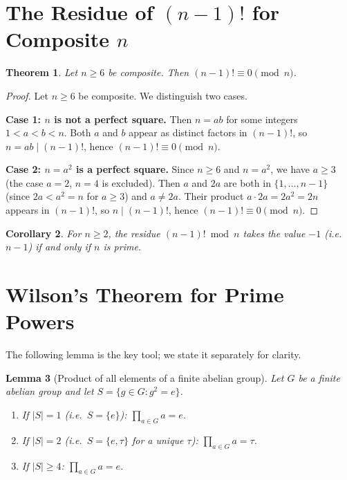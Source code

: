 \documentclass[12pt,a4paper]{amsart}
\newtheorem{theorem}{Theorem}[section]
\newtheorem{lemma}[theorem]{Lemma}
\newtheorem{corollary}[theorem]{Corollary}
\theoremstyle{definition}
\begin{document}
\section{The Residue of $(n-1)!$ for Composite $n$}

\begin{theorem}\label{thm:composite_factorial}
  Let $n \geq 6$ be composite.  Then $(n-1)! \equiv 0 \pmod n$.
\end{theorem}

\begin{proof}
  Let $n \geq 6$ be composite.  We distinguish two cases.

  \textbf{Case 1: $n$ is not a perfect square.}
  Then $n = ab$ for some integers $1 < a < b < n$.
  Both $a$ and $b$ appear as distinct factors in $(n-1)!$,
  so $n = ab \mid (n-1)!$, hence $(n-1)! \equiv 0 \pmod n$.

  \textbf{Case 2: $n = a^2$ is a perfect square.}
  Since $n \geq 6$ and $n = a^2$, we have $a \geq 3$
  (the case $a=2$, $n=4$ is excluded).
  Then $a$ and $2a$ are both in $\{1,\ldots,n-1\}$
  (since $2a < a^2 = n$ for $a \geq 3$) and $a \ne 2a$.
  Their product $a \cdot 2a = 2a^2 = 2n$ appears in $(n-1)!$,
  so $n \mid (n-1)!$, hence $(n-1)! \equiv 0 \pmod n$.
\end{proof}

\begin{corollary}
  For $n \geq 2$, the residue $(n-1)! \bmod n$ takes the value $-1$ (i.e.\ $n-1$)
  if and only if $n$ is prime.
\end{corollary}

\section{Wilson's Theorem for Prime Powers}

The following lemma is the key tool; we state it separately for clarity.

\begin{lemma}[Product of all elements of a finite abelian group]%
  \label{lem:cyclic_product}
  Let $G$ be a finite abelian group and let $S = \{g \in G : g^2 = e\}$.
  \begin{enumerate}
    \item[(a)] If $|S| = 1$ (i.e.\ $S = \{e\}$): $\prod_{a \in G} a = e$.
    \item[(b)] If $|S| = 2$ (i.e.\ $S = \{e, \tau\}$ for a unique $\tau$):
      $\prod_{a \in G} a = \tau$.
    \item[(c)] If $|S| \geq 4$: $\prod_{a \in G} a = e$.
  \end{enumerate}
\end{lemma}
\end{document}
